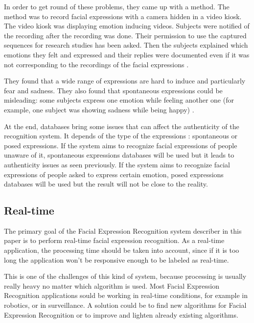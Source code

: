 \vspace{\baselineskip}
\noindent In order to get round of these problems, they came up with a method. The method was to record facial expressions with a camera hidden in a video kiosk. The video kiosk was displaying emotion inducing videos. Subjects were notified of the recording after the recording was done. Their permission to use the captured sequences for research studies has been asked. Then the subjects explained which emotions they felt and expressed and their replies were documented even if it was not corresponding to the recordings of the facial expressions \cite{SEB07}.
\newline

\noindent They found that a wide range of expressions are hard to induce and particularly fear and sadness. They also found that spontaneous expressions could be misleading: some subjects express one emotion while feeling another one (for example, one subject was showing sadness while being happy) \cite{SEB07}.
\newline

\noindent At the end, databases bring some issues that can affect the authenticity of the recognition system. It depends of the type of the expressions : spontaneous or posed expressions. If the system aims to recognize facial expressions of people unaware of it, spontaneous expressions databases will be used but it leads to authenticity issues as seen previously. If the system aims to recognize facial expressions of people asked to express certain emotion, posed expressions databases will be used but the result will not be close to the reality.
\newline

\subsection{Real-time}

\vspace{\baselineskip}
\noindent The primary goal of the Facial Expression Recognition system describer in this paper is to perform real-time facial expression recognition. As a real-time application, the processing time should be taken into account, since if it is too long the application won't be responsive enough to be labeled as real-time.
\newline

\noindent This is one of the challenges of this kind of system, because processing is usually really heavy no matter which algorithm is used. Most Facial Expression Recognition applications sould be working in real-time conditions, for example in robotics, or in surveillance. A solution could be to find new algorithms for Facial Expression Recognition or to improve and lighten already existing algorithms.
\newline


